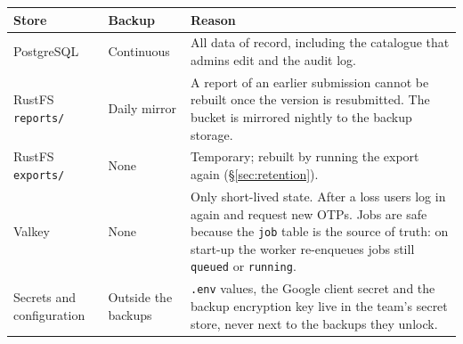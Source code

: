 \documentclass[11pt,a4paper]{article}
\newcommand{\tb}[1]{\texttt{#1}}
\begin{document}
{\small
\begin{longtable}{@{}R{3.0cm} R{2.2cm} R{10.9cm}@{}}
\toprule{}Store & Backup & Reason \\ \midrule\endhead
PostgreSQL & Continuous & All data of record, including the catalogue that admins edit and the audit log. \\
RustFS \tb{reports/} & Daily mirror & A report of an earlier submission cannot be rebuilt once the version is resubmitted. The bucket is mirrored nightly to the backup storage. \\
RustFS \tb{exports/} & None & Temporary; rebuilt by running the export again (\S\ref{sec:retention}). \\
Valkey & None & Only short-lived state. After a loss users log in again and request new OTPs. Jobs are safe because the \tb{job} table is the source of truth: on start-up the worker re-enqueues jobs still \tb{queued} or \tb{running}. \\
Secrets and configuration & Outside the backups & \tb{.env} values, the Google client secret and the backup encryption key live in the team's secret store, never next to the backups they unlock. \\
\bottomrule
\end{longtable}}
\end{document}
